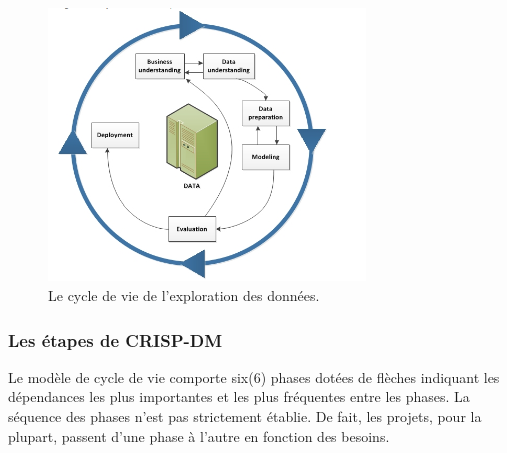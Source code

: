 \documentclass[a4paper,14pt]{article}
\begin{document}
        \begin{figure}[h]
                \centering
                \includegraphics[width=0.75\textwidth]{crispdm}
                \caption{Le cycle de vie de l'exploration des données.}
        \end{figure} 

        \subsubsection{Les étapes de CRISP-DM}
        Le modèle de cycle de vie comporte six(6) phases dotées de flèches indiquant les dépendances les plus importantes et les plus fréquentes entre les phases. La séquence des phases n'est pas strictement établie. De fait, les projets, pour la plupart, passent d'une phase à l'autre en fonction des besoins. 
\end{document}
